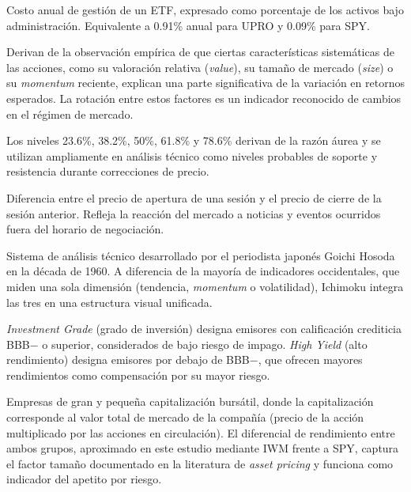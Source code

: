 \begin{description}[style=nextline, leftmargin=1.5cm]
\item[\hypertarget{glos:expense_ratio}{\textit{Expense ratio}}]
Costo anual de gesti\'on de un ETF, expresado como porcentaje de los activos bajo administraci\'on. Equivalente a 0.91\% anual para UPRO y 0.09\% para SPY.

\item[\hypertarget{glos:factores_estilo}{Factores de estilo (\textit{asset pricing})}]
Derivan de la observaci\'on emp\'irica de que ciertas caracter\'isticas sistem\'aticas de las acciones, como su valoraci\'on relativa (\textit{value}), su tama\~no de mercado (\textit{size}) o su \textit{momentum} reciente, explican una parte significativa de la variaci\'on en retornos esperados. La rotaci\'on entre estos factores es un indicador reconocido de cambios en el r\'egimen de mercado.

\item[\hypertarget{glos:fibonacci}{Niveles de Fibonacci}]
Los niveles 23.6\%, 38.2\%, 50\%, 61.8\% y 78.6\% derivan de la raz\'on \'aurea y se utilizan ampliamente en an\'alisis t\'ecnico como niveles probables de soporte y resistencia durante correcciones de precio.

\item[\hypertarget{glos:gap_overnight}{\textit{Gap overnight}}]
Diferencia entre el precio de apertura de una sesi\'on y el precio de cierre de la sesi\'on anterior. Refleja la reacci\'on del mercado a noticias y eventos ocurridos fuera del horario de negociaci\'on.

\item[\hypertarget{glos:ichimoku}{Ichimoku Kinko Hyo}]
Sistema de an\'alisis t\'ecnico desarrollado por el periodista japon\'es Goichi Hosoda en la d\'ecada de 1960. A diferencia de la mayor\'ia de indicadores occidentales, que miden una sola dimensi\'on (tendencia, \textit{momentum} o volatilidad), Ichimoku integra las tres en una estructura visual unificada.

\item[\hypertarget{glos:ig_hy}{\textit{Investment Grade} / \textit{High Yield}}]
\textit{Investment Grade} (grado de inversi\'on) designa emisores con calificaci\'on crediticia BBB$-$ o superior, considerados de bajo riesgo de impago. \textit{High Yield} (alto rendimiento) designa emisores por debajo de BBB$-$, que ofrecen mayores rendimientos como compensaci\'on por su mayor riesgo.

\item[\hypertarget{glos:large_small_caps}{\textit{Large caps} / \textit{Small caps}}]
Empresas de gran y peque\~na capitalizaci\'on burs\'atil, donde la capitalizaci\'on corresponde al valor total de mercado de la compa\~n\'ia (precio de la acci\'on multiplicado por las acciones en circulaci\'on). El diferencial de rendimiento entre ambos grupos, aproximado en este estudio mediante IWM frente a SPY, captura el factor tama\~no documentado en la literatura de \textit{asset pricing} y funciona como indicador del apetito por riesgo.


\end{description}
